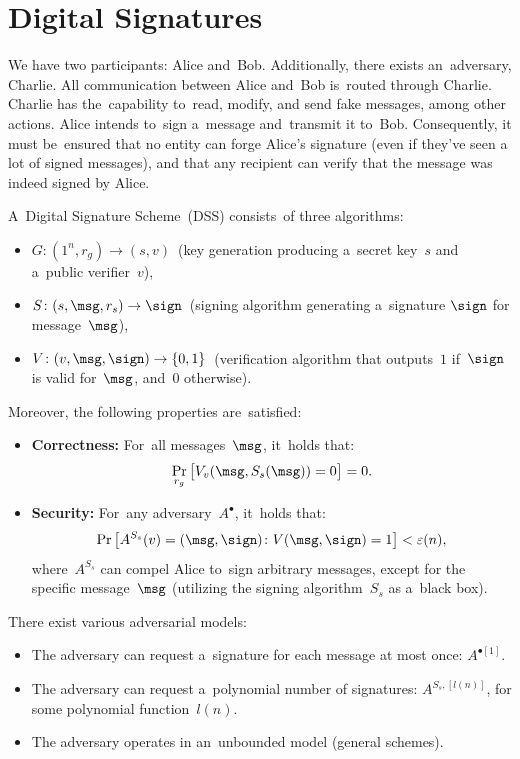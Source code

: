 \section{Digital Signatures}

We have two participants: Alice and~Bob.
Additionally, there exists an~adversary, Charlie.
All communication between Alice and~Bob is~routed through Charlie.
Charlie has the~capability to~read, modify, and send fake messages, among other actions.
Alice intends to~sign a~message and~transmit it to~Bob.
Consequently, it must be~ensured that no entity can forge Alice's signature (even if they've seen a lot of signed messages), and that any recipient can verify that the message was indeed signed by Alice.

\begin{definition}
	A~Digital Signature Scheme~(DSS) consists~of three algorithms:
	\begin{itemize}
		\item $G \colon (1^{n}, r_g) \to (s, v)$~(key generation producing a~secret key~$s$ and a~public verifier~$v$),
		\item $S \colon (s, \msg, r_s) \to \sign$~(signing algorithm generating a~signature $\sign$ for message~$\msg$),
		\item $V \colon (v, \msg, \sign) \to \{0, 1\}$~(verification algorithm that outputs~$1$ if~$\sign$ is valid for~$\msg$, and~$0$ otherwise).
	\end{itemize}

	Moreover, the following properties are~satisfied:
	\begin{itemize}
		\item \textbf{Correctness:} For~all messages~$\msg$, it~holds that:
			\[
				\Pr_{r_g}\big[V_v(\msg, S_s(\msg)) = 0\big] = 0.
			\] 

		\item \textbf{Security:} For~any adversary~$A^\bullet$, it~holds that:
			\[
				\Pr\big[A^{S_s}(v) = (\msg, \sign) \colon V(\msg, \sign) = 1\big] < \varepsilon(n),
			\]
			where~$A^{S_s}$ can compel Alice to~sign arbitrary messages, except for the specific message~$\msg$ (utilizing the signing algorithm~$S_s$ as a~black box).
	\end{itemize}
\end{definition}

There exist various adversarial models:
\begin{itemize}
	\item The adversary can request a~signature for each message at most once: $A^{\bullet[1]}$.
	\item The adversary can request a~polynomial number of signatures: $A^{S_s, [l(n)]}$, for some polynomial function~$l(n)$.
	\item The adversary operates in an~unbounded model (general schemes).
\end{itemize}

